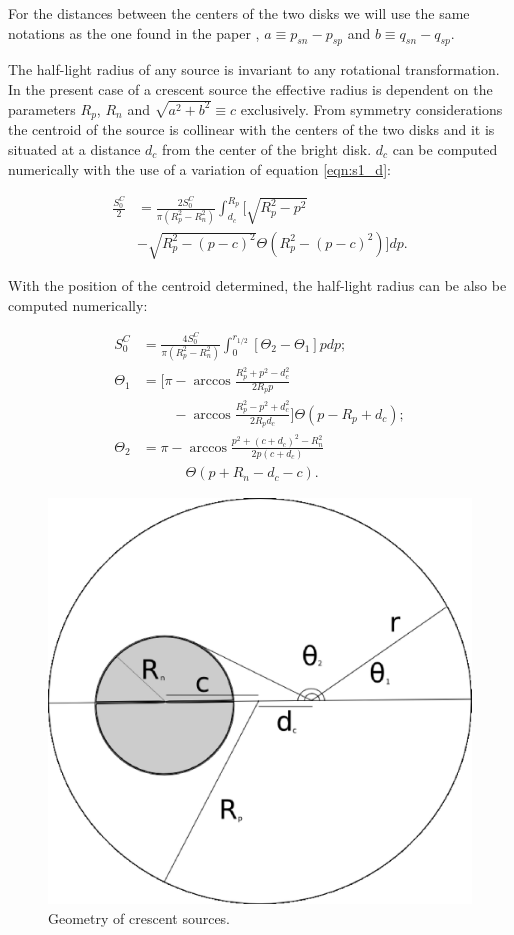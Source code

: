 \documentclass[usenatbib]{mn2e}
\begin{document}
For the distances between the centers of the two disks we will use the same notations as the one found in the paper \citep{2013MNRAS.434..765K}, $a \equiv p_{sn} - p_{sp}$ and $b \equiv q_{sn} - q_{sp}$.

The half-light radius of any source is invariant to any rotational transformation. In the present case of a crescent source the effective radius is dependent on the parameters $R_p$, $R_n$ and $\sqrt{a^2+b^2}\equiv c $ exclusively. From symmetry considerations the centroid of the source is collinear with the centers of the two disks and it is situated at a distance $d_c$ from the center of the bright disk. $d_c$ can be computed numerically with the use of a variation of equation \ref{eqn:s1_d}:

\begin{equation}
\begin{aligned}
\frac{S_0^C}{2} & = \frac{2 S_0^C}{\pi \left(R_p^2-R_n^2 \right)} \int_{d_c}^{R_p} \bigg[ \sqrt{R_p^2 - p^2} \\ 
        & - \sqrt{R_p^2 - \left(p-c\right)^2} \Theta \left(R_p^2 - \left(p-c\right)^2 \right) \bigg] dp. 
\end{aligned}
\end{equation}   

With the position of the centroid determined, the half-light radius can be also be computed numerically:
 
\begin{equation}
\begin{aligned}
S_0^C &=  \frac{4S_0^C}{\pi \left(R_p^2-R_n^2 \right)} \int_{0}^{r_{1/2}} \left[ \Theta_2  - \Theta_1  \right] p dp; \\
\Theta_1 &= \bigg[ \pi - \arccos \frac{R_p^2 + p^2 -d_c^2}{2 R_p p} \\
         & \phantom{= \bigg[ \pi} - \arccos \frac{R_p^2 - p^2 + d_c^2}{2 R_p d_c}
            \bigg] \Theta \left( p - R_p + d_c \right); \\
\Theta_2 &=  \pi - \arccos \frac{ p^2  + (c+d_c)^2 - R_n^2}
                                {2 p \left(c + d_c \right)} \\
         & \phantom{= \pi - } \Theta \left( p + R_n - d_c -c \right). 
\end{aligned}
\end{equation}

\begin{figure}
\includegraphics[width = .49\textwidth]{figures/figure_rhalf.eps}
\caption{\label{fig:geom_crescent} Geometry of crescent sources.}
\end{figure}
\end{document}
